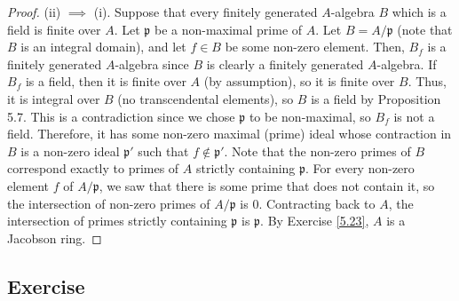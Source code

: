 \begin{proof}
(ii) $\implies$ (i). Suppose that every finitely generated $A$-algebra $B$ which is a field is finite over $A$. Let $\mathfrak{p}$ be a non-maximal prime of $A$.
Let $B = A/\mathfrak{p}$ (note that $B$ is an integral domain), and let $f \in B$ be some non-zero element. Then, $B_f$ is a finitely generated $A$-algebra since
$B$ is clearly a finitely generated $A$-algebra. If $B_f$ is a field, then it is finite over $A$ (by assumption), so it is finite over $B$. Thus, it is integral
over $B$ (no transcendental elements), so $B$ is a field by Proposition 5.7. This is a contradiction since we chose $\mathfrak{p}$ to be non-maximal, so $B_f$
is not a field. Therefore, it has some non-zero maximal (prime) ideal whose contraction in $B$ is a non-zero ideal $\mathfrak{p}'$ such that $f \not\in \mathfrak{p}'$. 
Note that the non-zero primes of $B$ correspond exactly to primes of $A$ strictly containing $\mathfrak{p}$. For every non-zero element $f$ of $A/\mathfrak{p}$, we saw
that there is some prime that does not contain it, so the intersection of non-zero primes of $A/\mathfrak{p}$ is $0$. Contracting back to $A$, the intersection of
primes strictly containing $\mathfrak{p}$ is $\mathfrak{p}$. By Exercise \ref{5.23}, $A$ is a Jacobson ring.
\end{proof}

\subsection{Exercise}\label{5.26}

